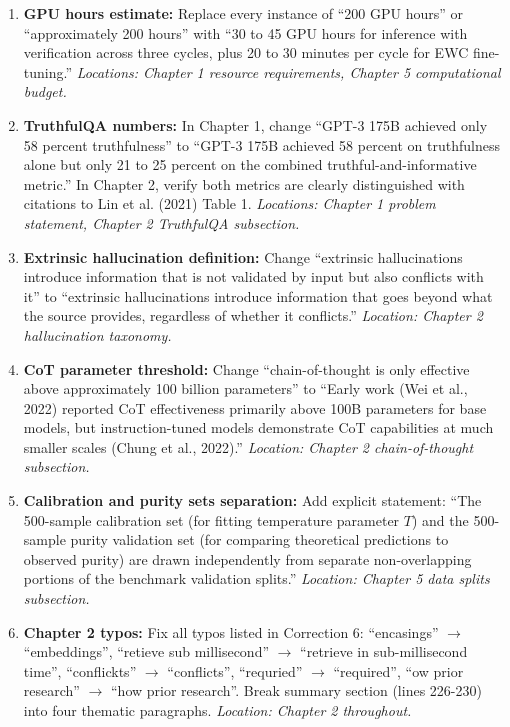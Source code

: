 \documentclass[11pt,a4paper]{article}
\begin{document}
\begin{enumerate}
\item \textbf{GPU hours estimate:} Replace every instance of ``200 GPU hours'' or ``approximately 200 hours'' with ``30 to 45 GPU hours for inference with verification across three cycles, plus 20 to 30 minutes per cycle for EWC fine-tuning.'' \textit{Locations: Chapter 1 resource requirements, Chapter 5 computational budget.}

\item \textbf{TruthfulQA numbers:} In Chapter 1, change ``GPT-3 175B achieved only 58 percent truthfulness'' to ``GPT-3 175B achieved 58 percent on truthfulness alone but only 21 to 25 percent on the combined truthful-and-informative metric.'' In Chapter 2, verify both metrics are clearly distinguished with citations to Lin et al. (2021) Table 1. \textit{Locations: Chapter 1 problem statement, Chapter 2 TruthfulQA subsection.}

\item \textbf{Extrinsic hallucination definition:} Change ``extrinsic hallucinations introduce information that is not validated by input but also conflicts with it'' to ``extrinsic hallucinations introduce information that goes beyond what the source provides, regardless of whether it conflicts.'' \textit{Location: Chapter 2 hallucination taxonomy.}

\item \textbf{CoT parameter threshold:} Change ``chain-of-thought is only effective above approximately 100 billion parameters'' to ``Early work (Wei et al., 2022) reported CoT effectiveness primarily above 100B parameters for base models, but instruction-tuned models demonstrate CoT capabilities at much smaller scales (Chung et al., 2022).'' \textit{Location: Chapter 2 chain-of-thought subsection.}

\item \textbf{Calibration and purity sets separation:} Add explicit statement: ``The 500-sample calibration set (for fitting temperature parameter $T$) and the 500-sample purity validation set (for comparing theoretical predictions to observed purity) are drawn independently from separate non-overlapping portions of the benchmark validation splits.'' \textit{Location: Chapter 5 data splits subsection.}

\item \textbf{Chapter 2 typos:} Fix all typos listed in Correction 6: ``encasings'' $\to$ ``embeddings'', ``retieve sub millisecond'' $\to$ ``retrieve in sub-millisecond time'', ``conflickts'' $\to$ ``conflicts'', ``requried'' $\to$ ``required'', ``ow prior research'' $\to$ ``how prior research''. Break summary section (lines 226-230) into four thematic paragraphs. \textit{Location: Chapter 2 throughout.}
\end{enumerate}
\end{document}

